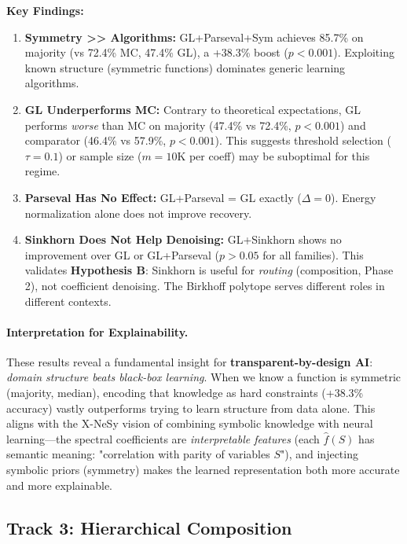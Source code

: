 \documentclass[Royal,times,sageh]{sagej}
\begin{document}
\textbf{Key Findings:}
\begin{enumerate}
    \item \textbf{Symmetry >> Algorithms:} GL+Parseval+Sym achieves 85.7\% on majority (vs 72.4\% MC, 47.4\% GL), a +38.3\% boost ($p < 0.001$). Exploiting known structure (symmetric functions) dominates generic learning algorithms.

    \item \textbf{GL Underperforms MC:} Contrary to theoretical expectations, GL performs \textit{worse} than MC on majority (47.4\% vs 72.4\%, $p < 0.001$) and comparator (46.4\% vs 57.9\%, $p < 0.001$). This suggests threshold selection ($\tau = 0.1$) or sample size ($m=10$K per coeff) may be suboptimal for this regime.

    \item \textbf{Parseval Has No Effect:} GL+Parseval = GL exactly ($\Delta = 0$). Energy normalization alone does not improve recovery.

    \item \textbf{Sinkhorn Does Not Help Denoising:} GL+Sinkhorn shows no improvement over GL or GL+Parseval ($p > 0.05$ for all families). This validates \textbf{Hypothesis B}: Sinkhorn is useful for \textit{routing} (composition, Phase 2), not coefficient denoising. The Birkhoff polytope serves different roles in different contexts.
\end{enumerate}

\paragraph{Interpretation for Explainability.} These results reveal a fundamental insight for \textbf{transparent-by-design AI}: \textit{domain structure beats black-box learning}. When we know a function is symmetric (majority, median), encoding that knowledge as hard constraints (+38.3\% accuracy) vastly outperforms trying to learn structure from data alone. This aligns with the X-NeSy vision of combining symbolic knowledge with neural learning---the spectral coefficients are \textit{interpretable features} (each $\hat{f}(S)$ has semantic meaning: "correlation with parity of variables $S$"), and injecting symbolic priors (symmetry) makes the learned representation both more accurate and more explainable.

\subsection{Track 3: Hierarchical Composition}
\end{document}
